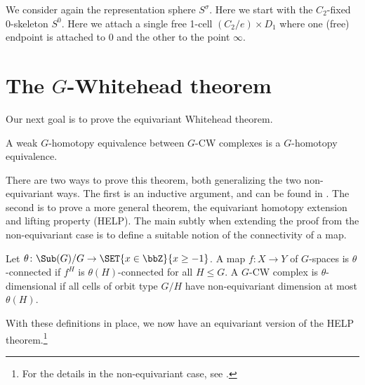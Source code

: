 \documentclass{willowtreebook}
\begin{document}
\begin{example}
    We consider again the representation sphere $S^{\sigma}$. Here we start with the $C_2$-fixed 0-skeleton $S^0$. Here we attach a single free 1-cell $(C_2/e) \times D_1$ where one (free) endpoint is attached to 0 and the other to the point $\infty$. 
\end{example}
\section{The $G$-Whitehead theorem}
Our next goal is to prove the equivariant Whitehead theorem.
\begin{theorem}
A weak $G$-homotopy equivalence between $G$-CW complexes is a $G$-homotopy equivalence. 
\end{theorem}
There are two ways to prove this theorem, both generalizing the two non-equivariant ways. The first is an inductive argument, and can be found in \cite[Theorem 2.1.31]{guillou}. The second is to prove a more general theorem, the equivariant homotopy extension and lifting property (HELP). The main subtly when extending the proof from the non-equivariant case is to define a suitable notion of the connectivity of a map. 
\begin{definition}
    Let $\theta \colon \Sub(G)/G \to \SET{x \in \bbZ}{x \ge -1}$. A map $f \colon X \to Y$ of $G$-spaces is $\theta$-connected if $f^H$ is $\theta(H)$-connected for all $H \le G$. A $G$-CW complex is $\theta$-dimensional if all cells of orbit type $G/H$ have non-equivariant dimension at most $\theta(H)$. 
\end{definition}
With these definitions in place, we now have an equivariant version of the HELP theorem.\footnote{For the details in the non-equivariant case, see \cite[Chapter 10.3]{May1999concise}.} 
\end{document}

